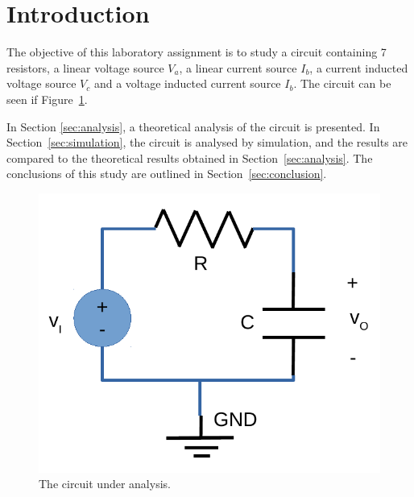 \section{Introduction}
\label{sec:introduction}

The objective of this laboratory assignment is to study a circuit containing 7 resistors, a linear voltage source $V_a$, a linear current source $I_b$, a current inducted voltage source $V_c$ and a voltage inducted current source $I_b$. The circuit can be seen if Figure~\ref{fig:rc}.


In Section \ref{sec:analysis}, a theoretical analysis of the circuit is
presented. In Section~\ref{sec:simulation}, the circuit is analysed by
simulation, and the results are compared to the theoretical results obtained in
Section~\ref{sec:analysis}. The conclusions of this study are outlined in
Section~\ref{sec:conclusion}.



\begin{figure}[h] \centering
\includegraphics[width=0.6\linewidth]{rc.pdf}
\caption{The circuit under analysis.}
\label{fig:rc}
\end{figure}\label{fig:rc}

